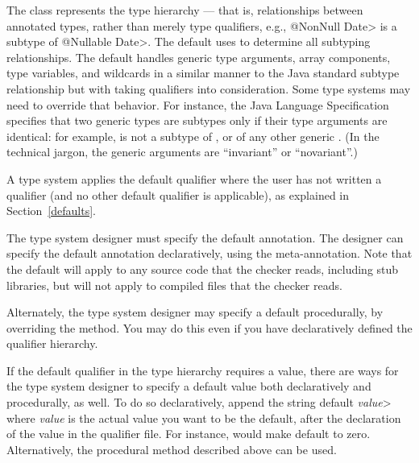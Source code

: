 The  class represents the type hierarchy ---
that is, relationships between
annotated types, rather than merely type qualifiers, e.g., \<@NonNull
Date> is a subtype of \<@Nullable Date>.  The default  uses
 to determine all subtyping relationships.
The default  handles
generic type arguments, array components, type variables, and
wildcards in a similar manner to the Java standard subtype
relationship but with taking qualifiers into consideration.  Some type
systems may need to override that behavior.  For instance, the Java
Language Specification specifies that two generic types are subtypes only
if their type arguments are identical:  for example,
 is not a subtype of , or of any other
generic .
(In the technical jargon, the generic arguments are ``invariant'' or ``novariant''.)



A type system applies the default qualifier where the user has not written a
qualifier (and no other default qualifier is applicable), as explained in
Section~\ref{defaults}.

The type system designer must specify the default annotation. The designer can specify the default annotation declaratively,
using the 
meta-annotation.
Note that the default will apply to any source code that the checker reads,
including stub libraries, but will not apply to compiled 
files that the checker reads.

\begin{sloppypar}
Alternately, the type system designer may specify a default procedurally,
by overriding the
method.  You may do this even if you have declaratively defined the
qualifier hierarchy.
\end{sloppypar}

If the default qualifier in the type hierarchy requires a value, there are
ways for the type system designer to specify a default value both
declaratively and procedurally, as well.  To do so declaratively, append
the string \<default \emph{value}> where \emph{value} is the actual value
you want to be the default, after the declaration of the value in the
qualifier file.  For instance,  would make
 default to zero. Alternatively, the procedural method
described above can be used.

